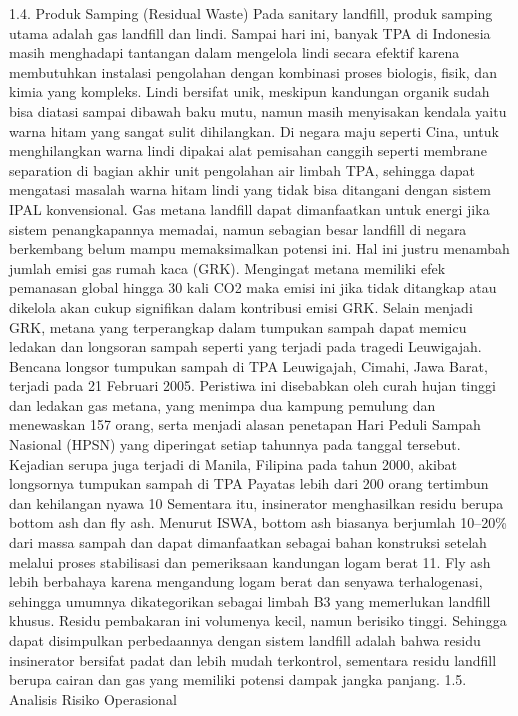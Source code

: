 \documentclass[
  letterpaper,
  DIV=11,
  numbers=noendperiod]{scrreprt}
\begin{document}
1.4. Produk Samping (Residual Waste) Pada sanitary landfill, produk
samping utama adalah gas landfill dan lindi. Sampai hari ini, banyak TPA
di Indonesia masih menghadapi tantangan dalam mengelola lindi secara
efektif karena membutuhkan instalasi pengolahan dengan kombinasi proses
biologis, fisik, dan kimia yang kompleks. Lindi bersifat unik, meskipun
kandungan organik sudah bisa diatasi sampai dibawah baku mutu, namun
masih menyisakan kendala yaitu warna hitam yang sangat sulit
dihilangkan. Di negara maju seperti Cina, untuk menghilangkan warna
lindi dipakai alat pemisahan canggih seperti membrane separation di
bagian akhir unit pengolahan air limbah TPA, sehingga dapat mengatasi
masalah warna hitam lindi yang tidak bisa ditangani dengan sistem IPAL
konvensional. Gas metana landfill dapat dimanfaatkan untuk energi jika
sistem penangkapannya memadai, namun sebagian besar landfill di negara
berkembang belum mampu memaksimalkan potensi ini. Hal ini justru
menambah jumlah emisi gas rumah kaca (GRK). Mengingat metana memiliki
efek pemanasan global hingga 30 kali CO2 maka emisi ini jika tidak
ditangkap atau dikelola akan cukup signifikan dalam kontribusi emisi
GRK. Selain menjadi GRK, metana yang terperangkap dalam tumpukan sampah
dapat memicu ledakan dan longsoran sampah seperti yang terjadi pada
tragedi Leuwigajah. Bencana longsor tumpukan sampah di TPA Leuwigajah,
Cimahi, Jawa Barat, terjadi pada 21 Februari 2005. Peristiwa ini
disebabkan oleh curah hujan tinggi dan ledakan gas metana, yang menimpa
dua kampung pemulung dan menewaskan 157 orang, serta menjadi alasan
penetapan Hari Peduli Sampah Nasional (HPSN) yang diperingat setiap
tahunnya pada tanggal tersebut. Kejadian serupa juga terjadi di Manila,
Filipina pada tahun 2000, akibat longsornya tumpukan sampah di TPA
Payatas lebih dari 200 orang tertimbun dan kehilangan nyawa 10 Sementara
itu, insinerator menghasilkan residu berupa bottom ash dan fly ash.
Menurut ISWA, bottom ash biasanya berjumlah 10--20\% dari massa sampah
dan dapat dimanfaatkan sebagai bahan konstruksi setelah melalui proses
stabilisasi dan pemeriksaan kandungan logam berat 11. Fly ash lebih
berbahaya karena mengandung logam berat dan senyawa terhalogenasi,
sehingga umumnya dikategorikan sebagai limbah B3 yang memerlukan
landfill khusus. Residu pembakaran ini volumenya kecil, namun berisiko
tinggi. Sehingga dapat disimpulkan perbedaannya dengan sistem landfill
adalah bahwa residu insinerator bersifat padat dan lebih mudah
terkontrol, sementara residu landfill berupa cairan dan gas yang
memiliki potensi dampak jangka panjang. 1.5. Analisis Risiko Operasional
\end{document}
